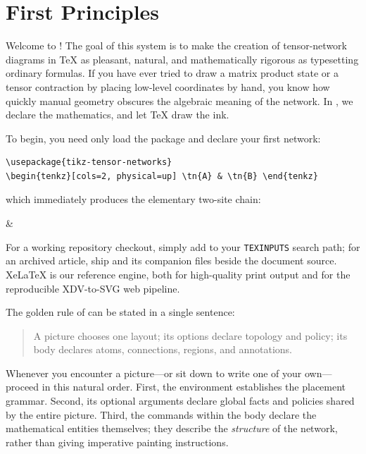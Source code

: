 \section{First Principles}\label{ch:install}

Welcome to \pkg{}!  The goal of this system is to make the creation of
tensor-network diagrams in \TeX{} as pleasant, natural, and mathematically
rigorous as typesetting ordinary formulas.  If you have ever tried to draw a
matrix product state or a tensor contraction by placing low-level coordinates
by hand, you know how quickly manual geometry obscures the algebraic meaning
of the network.  In \pkg{}, we declare the mathematics, and let \TeX{} draw the ink.

To begin, you need only load the package and declare your first network:

\begin{Verbatim}[fontsize=\small,frame=leftline]
\usepackage{tikz-tensor-networks}
\begin{tenkz}[cols=2, physical=up] \tn{A} & \tn{B} \end{tenkz}
\end{Verbatim}
which immediately produces the elementary two-site chain:
\begin{center}
  \begin{tenkz}[cols=2, physical=up]  &  \end{tenkz}
\end{center}


For a working repository checkout, simply add  to
your \texttt{TEXINPUTS} search path; for an archived article, ship
 and its companion files beside the document source.
XeLaTeX is our reference engine, both for high-quality print output and for the
reproducible XDV-to-SVG web pipeline.

The golden rule of \pkg{} can be stated in a single sentence:

\begin{quote}\large
A picture chooses one layout; its options declare topology and policy; its
body declares atoms, connections, regions, and annotations.
\end{quote}

Whenever you encounter a \pkg{} picture---or sit down to write one of your
own---proceed in this natural order.  First, the environment establishes the
placement grammar.  Second, its optional arguments declare global facts and
policies shared by the entire picture.  Third, the commands within the body
declare the mathematical entities themselves; they describe the \emph{structure}
of the network, rather than giving imperative painting instructions.

